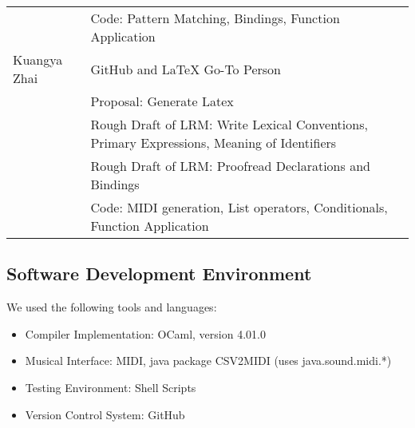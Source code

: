\begin{table}[htdp]
\begin{tabular}{|l|l|}
										& Code: Pattern Matching, Bindings, Function Application \\
		Kuangya Zhai & GitHub and LaTeX Go-To Person \\ 
								& Proposal: Generate Latex \\
								& Rough Draft of LRM: Write Lexical Conventions, Primary Expressions, Meaning of Identifiers \\
								& Rough Draft of LRM:  Proofread Declarations and Bindings \\
								& Code: MIDI generation, List operators, Conditionals, Function Application \\
		\hline
		\end{tabular}
		\end{table} 
		
	\subsection{Software Development Environment}
		We used the following tools and languages:
		\begin{itemize}
		\item Compiler Implementation: OCaml, version 4.01.0
		\item Musical Interface: MIDI, java package CSV2MIDI (uses java.sound.midi.*) ~\cite{csv2midi} 
		\item Testing Environment: Shell Scripts
		\item Version Control System: GitHub
		\end{itemize}
\newpage	
